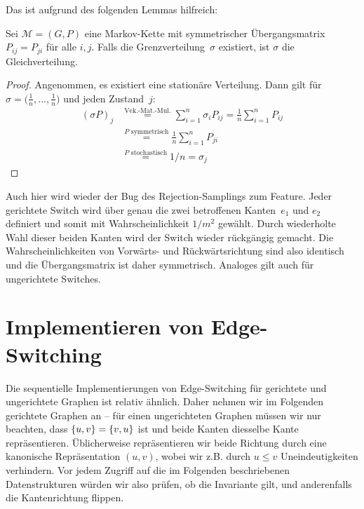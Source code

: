 Das ist aufgrund des folgenden Lemmas hilfreich:
\begin{lemma}
    Sei $\mathcal M = (G, P)$ eine Markov-Kette mit symmetrischer Übergangsmatrix $P_{ij} = P_{ji}$ für alle $i, j$.
    Falls die Grenzverteilung~$\sigma$ existiert, ist $\sigma$ die Gleichverteilung.
\end{lemma}

\begin{proof}
    Angenommen, es existiert eine stationäre Verteilung.
    Dann gilt für $\sigma = \bigl(\frac{1}{n}, \ldots, \allowbreak \frac{1}{n}\bigr)$ und jeden Zustand~$j$:
    \begin{align}
        (\sigma P) _ j & \stackrel{\text{Vek.-Mat.-Mul.}}{=} \sum_{i=1}^n \sigma_i P_{ij}
        = \frac 1 n \sum_{i=1}^n P_{ij}                                                   \\
                       & \stackrel{P\text{ symmetrisch}}{=} \frac 1 n \sum_{i=1}^n P_{ji} \\
                       & \stackrel{P\text{ stochastisch}}{=} 1 / n = \sigma_j
    \end{align}
\end{proof}

Auch hier wird wieder der Bug des Rejection-Samplings zum Feature.
Jeder gerichtete Switch wird über genau die zwei betroffenen Kanten~$e_1$ und $e_2$ definiert und somit mit Wahrscheinlichkeit $1/m^2$ gewählt.
Durch wiederholte Wahl dieser beiden Kanten wird der Switch wieder rückgängig gemacht.
Die Wahrscheinlichkeiten von Vorwärts- und Rückwärtsrichtung sind also identisch und die Übergangsmatrix ist daher symmetrisch.
Analoges gilt auch für ungerichtete Switches.

\section{Implementieren von Edge-Switching}
Die sequentielle Implementierungen von Edge-Switching für gerichtete und ungerichtete Graphen ist relativ ähnlich.
Daher nehmen wir im Folgenden gerichtete Graphen an -- für einen ungerichteten Graphen müssen wir nur beachten, dass $\left\{u, v\right\} = \left\{v, u\right\}$ ist und beide Kanten diesselbe Kante repräsentieren.
Üblicherweise repräsentieren wir beide Richtung durch eine kanonische Repräsentation $(u, v)$, wobei wir z.B. durch $u \le v$ Uneindeutigkeiten verhindern.
Vor jedem Zugriff auf die im Folgenden beschriebenen Datenstrukturen würden wir also prüfen, ob die Invariante gilt, und anderenfalls die Kantenrichtung flippen.

